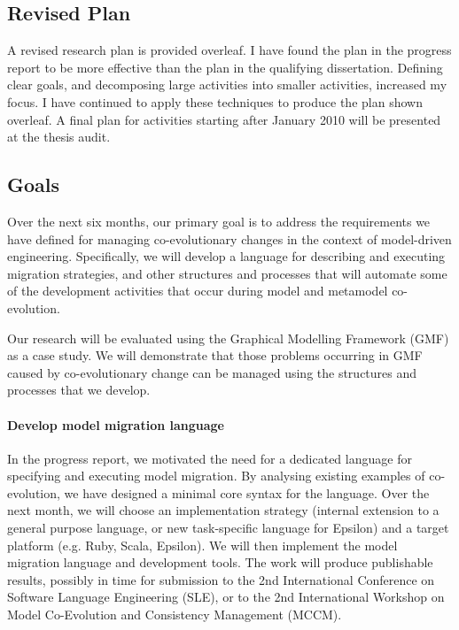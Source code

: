 
\subsection{Revised Plan}
\label{subsec:plan}
A revised research plan is provided overleaf. I have found the plan in the progress report to be more effective than the plan in the qualifying dissertation. Defining clear goals, and decomposing large activities into smaller activities, increased my focus. I have continued to apply these techniques to produce the plan shown overleaf. A final plan for activities starting after January 2010 will be presented at the thesis audit.

\clearpage
\setlength\paperheight{297mm}
\setlength\paperwidth{420mm}
\setlength\pdfpageheight{\paperheight}
\setlength\pdfpagewidth{\paperwidth}



\setlength\paperheight{297mm}
\setlength\paperwidth{210mm}
\setlength\pdfpageheight{\paperheight}
\setlength\pdfpagewidth{\paperwidth}

\subsection{Goals} %
\label{sub:goals}
Over the next six months, our primary goal is to address the requirements we have defined for managing co-evolutionary changes in the context of model-driven engineering. Specifically, we will develop a language for describing and executing migration strategies, and other structures and processes that will automate some of the development activities that occur during model and metamodel co-evolution.

Our research will be evaluated using the Graphical Modelling Framework (GMF) \cite{gronback06gmf} as a case study. We will demonstrate that those problems occurring in GMF caused by co-evolutionary change can be managed using the structures and processes that we develop.

\paragraph{Develop model migration language}
In the progress report, we motivated the need for a dedicated language for specifying and executing model migration. By analysing existing examples of co-evolution, we have designed a minimal core syntax for the language. Over the next month, we will choose an implementation strategy (internal extension to a general purpose language, or new task-specific language for Epsilon) and a target platform (e.g. Ruby, Scala, Epsilon). We will then implement the model migration language and development tools. The work will produce publishable results, possibly in time for submission to the 2nd International Conference on Software Language Engineering (SLE), or to the 2nd International Workshop on Model Co-Evolution and Consistency Management (MCCM).

